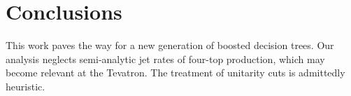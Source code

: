 \section{Conclusions}\label{sec:conclusions}

This work paves the way for a new generation of boosted decision trees.
Our analysis neglects semi-analytic jet rates of four-top production,
which may become relevant at the Tevatron. The treatment of unitarity
cuts is admittedly heuristic.

